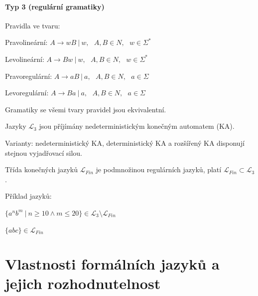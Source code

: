\paragraph*{Typ 3 (regulární gramatiky)} \begin{compactitem}
    \item Pravidla ve tvaru: \begin{compactitem}
        \item Pravolineární: $A \rightarrow wB~|~w,~~~ A,B \in N,~~~ w \in \Sigma^*$

        \item Levolineární: $A \rightarrow Bw~|~w,~~~ A,B \in N,~~~ w \in \Sigma^*$

        \item Pravoregulární: $A \rightarrow aB~|~a,~~~ A,B \in N,~~~ a \in \Sigma$

        \item Levoregulární: $A \rightarrow Ba~|~a,~~~ A,B \in N,~~~ a \in \Sigma$
    \end{compactitem}

    \item Gramatiky se všemi tvary pravidel jsou ekvivalentní.

    \item Jazyky $\mathcal{L}_3$ jsou příjímány nedeterministickým konečným automatem (KA). \begin{compactitem}
        \item Varianty: nedeterministický KA, deterministický KA a rozšířený KA disponují stejnou vyjadřovací silou.
    \end{compactitem}

    \item Třída konečných jazyků $\mathcal{L}_{Fin}$ je podmnožinou regulárních jazyků, platí $\mathcal{L}_{Fin} \subset \mathcal{L}_3$.

    \item Příklad jazyků: \begin{compactitem}
        \item $\{ a^n b^m ~|~ n \geq 10 \land m \leq 20 \} \in \mathcal{L}_{3} \setminus \mathcal{L}_{Fin}$
        \item $\{ abc \} \in \mathcal{L}_{Fin}$
    \end{compactitem}
\end{compactitem}


\section{Vlastnosti formálních jazyků a jejich rozhodnutelnost}

